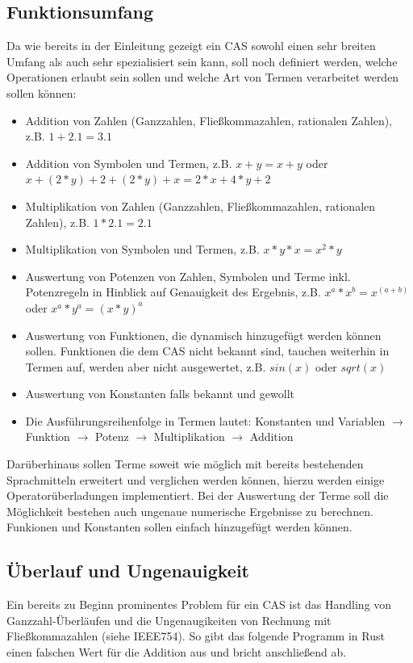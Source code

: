 \documentclass[11pt,a4paper, ngerman]{article}
\begin{document}
\subsection{Funktionsumfang}
Da wie bereits in der Einleitung gezeigt ein CAS sowohl einen sehr breiten Umfang als auch sehr spezialisiert sein kann, soll noch definiert werden, welche Operationen erlaubt sein sollen und welche Art von Termen verarbeitet werden sollen können:
\begin{itemize}
    \item Addition von Zahlen (Ganzzahlen, Fließkommazahlen, rationalen Zahlen), z.B. $1+2.1 = 3.1$
    \item Addition von Symbolen und Termen, z.B. $x+y = x+y$ oder $x+(2*y)+2+(2*y)+x = 2*x+4*y+2$
    \item Multiplikation von Zahlen (Ganzzahlen, Fließkommazahlen, rationalen Zahlen), z.B. $1*2.1 = 2.1$
    \item Multiplikation von Symbolen und Termen, z.B. $x*y*x = x^2*y$
    \item Auswertung von Potenzen von Zahlen, Symbolen und Terme inkl. Potenzregeln in Hinblick auf Genauigkeit des Ergebnis, z.B. $x^a*x^b=x^{(a+b)}$ oder $x^a*y^a = (x*y)^a$
    \item Auswertung von Funktionen, die dynamisch hinzugefügt werden können sollen. Funktionen die dem CAS nicht bekannt sind, tauchen weiterhin in Termen auf, werden aber nicht ausgewertet, z.B. $sin(x)$ oder $sqrt(x)$
    \item Auswertung von Konstanten falls bekannt und gewollt
    \item Die Ausführungsreihenfolge in Termen lautet: Konstanten und Variablen $\rightarrow$ Funktion $\rightarrow$ Potenz $\rightarrow$ Multiplikation $\rightarrow$ Addition
\end{itemize}

Darüberhinaus sollen Terme soweit wie möglich mit bereits bestehenden Sprachmitteln erweitert und verglichen werden können, hierzu werden einige Operatorüberladungen implementiert. Bei der Auswertung der Terme soll die Möglichkeit bestehen auch ungenaue numerische Ergebnisse zu berechnen. Funkionen und Konstanten sollen einfach hinzugefügt werden können.

\subsection{Überlauf und Ungenauigkeit}
Ein bereits zu Beginn prominentes Problem für ein CAS ist das Handling von Ganzzahl-Überläufen und die Ungenaugikeiten von Rechnung mit Fließkommazahlen (siehe IEEE754). So gibt das folgende Programm in Rust einen falschen Wert für die Addition aus und bricht anschließend ab.
\end{document}
